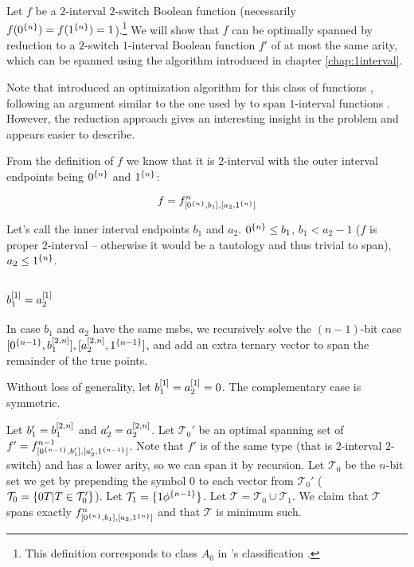 \newcommand{\ftwointtwoswitch}[4]
{#1^{#2}_{\interval{\rep{0}{#2}}{#3},
\interval{#4}{\rep{1}{#2}}}}

\newcommand{\fnba}{\ftwointtwoswitch{f}{n}{b_1}{a_2}}

Let $f$ be a $2$-interval $2$-switch Boolean function
(necessarily $f(0^{\{n\}}) = f(1^{\{n\}})
= 1$).\footnote{This definition corresponds to class $A_0$
in \citeauthor{Dubovsky2012}'s classification
\citep[p.~5]{Dubovsky2012}.}
We will show that $f$
can be optimally spanned by reduction to
a $2$-switch $1$-interval Boolean function $f'$
of at most the same arity,
which can be spanned using the algorithm introduced
in chapter \ref{chap:1interval}.

Note that
\citeauthor{Dubovsky2012} introduced an optimization algorithm for
this class of functions \citep[section 3.2]{Dubovsky2012},
following an argument similar to the one used by
\citeauthor{Schieber2005154} to span $1$-interval functions
\citep{Schieber2005154}.
However,
the reduction approach gives
an interesting insight in the problem
and appears easier to describe.

From the definition of $f$ we know that it is $2$-interval
with the outer interval endpoints being
$0^{\{n\}}$ and $1^{\{n\}}$:

\[
f = \fnba
\]

Let's call the inner interval endpoints $b_1$ and $a_2$.
$0^{\{n\}} \leq b_1$,
$b_1 < a_2 - 1$ ($f$ is proper $2$-interval
-- otherwise it would be a tautology
and thus trivial to span),
$a_2 \leq 1^{\{n\}}$.

\subsection{\texorpdfstring{$b_1^{[1]} = a_2^{[1]}$}
{ = }
}


In case $b_1$ and $a_2$ have the same \acrshort{msb}s,
we recursively solve the $(n-1)$-bit
case
$[0^{\{n-1\}}, b_1^{[2, n]}],
[a_2^{[2, n]}, 1^{\{n-1\}}]$,
and add an extra ternary vector to span the remainder
of the true points.

Without loss of generality,
let $b_1^{[1]} = a_2^{[1]} = 0$.
The complementary case is symmetric.

Let $b_1' = b_1^{[2, n]}$
and $a_2' = a_2^{[2, n]}$.
Let $\mathcal{T}_0'$ be an optimal spanning set of
$f' = \ftwointtwoswitch{f}{n-1}{b_1'}{a_2'}$.
Note that $f'$ is of the same type
(that is $2$-interval $2$-switch)
and has a lower arity,
so we can span it by recursion.
Let $\mathcal{T}_0$ be the $n$-bit set we get
by prepending the symbol $0$
to each vector from $\mathcal{T}_0'$
($\mathcal{T}_0 = \{0 T | T \in \mathcal{T}_0'\}$).
Let $\mathcal{T}_1 = \{1 \phi^{\{n-1\}}\}$.
Let $\mathcal{T} = \mathcal{T}_0 \cup \mathcal{T}_1$.
We claim that $\mathcal{T}$ spans exactly
$\fnba$
and that $\mathcal{T}$ is minimum such.


